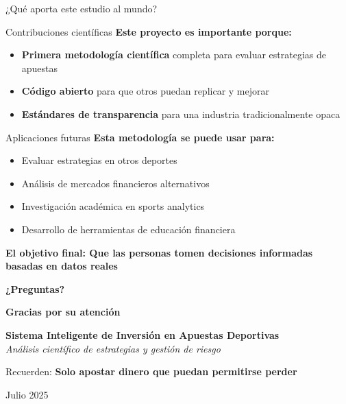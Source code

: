 \documentclass[aspectratio=169]{beamer}
\begin{document}
\begin{frame}{¿Qué aporta este estudio al mundo?}
\begin{block}{Contribuciones científicas}
\textbf{Este proyecto es importante porque:}
\begin{itemize}
\item \textcolor{azulprincipal}{\textbf{Primera metodología científica}} completa para evaluar estrategias de apuestas
\item \textcolor{verdeganancia}{\textbf{Código abierto}} para que otros puedan replicar y mejorar
\item \textcolor{naranjaatencion}{\textbf{Estándares de transparencia}} para una industria tradicionalmente opaca
\end{itemize}
\end{block}

\begin{block}{Aplicaciones futuras}
\textbf{Esta metodología se puede usar para:}
\begin{itemize}
\item Evaluar estrategias en otros deportes
\item Análisis de mercados financieros alternativos
\item Investigación académica en sports analytics
\item Desarrollo de herramientas de educación financiera
\end{itemize}
\end{block}

\vspace{0.5cm}
\begin{center}
\textbf{El objetivo final: Que las personas tomen decisiones informadas basadas en datos reales}
\end{center}
\end{frame}

\begin{frame}
\begin{center}
\Huge \textcolor{azulprincipal}{\textbf{¿Preguntas?}}

\vspace{1cm}
\Large 
\textbf{Gracias por su atención}

\vspace{0.8cm}
\large
\textbf{Sistema Inteligente de Inversión en Apuestas Deportivas}\\
\textit{Análisis científico de estrategias y gestión de riesgo}

\vspace{0.5cm}
\normalsize
Recuerden: \textcolor{rojoperdida}{\textbf{Solo apostar dinero que puedan permitirse perder}}

\vspace{0.3cm}
Julio 2025
\end{center}
\end{frame}
\end{document}

